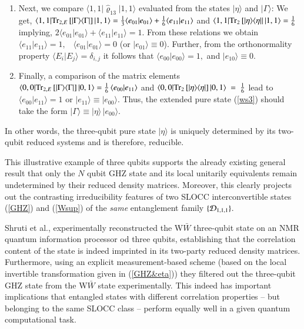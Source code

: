 {\begin{enumerate}
\item Next, we compare  $\langle 1,1\vert \hat{\varrho}_{13}\vert 1,1\rangle$ evaluated from the states 
$\vert\eta\rangle$ and $\vert\Gamma\rangle$:  
We get, 
$\langle 1,1|{\rm Tr}_{2, E}\, [|\Gamma\rangle \langle\Gamma|]\,\vert 1,1\rangle=
\frac{1}{3}\langle e_{01}|e_{01}\rangle+\frac{1}{6}\langle e_{11}|e_{11}\rangle$ 
and $\langle 1,1|{\rm Tr}_{2}\, [|\eta\rangle \langle\eta|\vert\, |1,1\rangle=\frac{1}{6}$ 
implying,  
$2\langle e_{01}|e_{01}\rangle+\langle e_{11}|e_{11}\rangle=1.$ 
From these relations we obtain $\langle e_{11}|e_{11}\rangle=1,$ \ 
$\langle e_{01}|e_{01}\rangle=0$ (or $\vert e_{01}\rangle\equiv 0$).
Further, from the orthonormality property $\langle E_i\vert E_j\rangle=\delta_{i,j}$
it follows that $\langle e_{00}\vert e_{00}\rangle=1,$ and  
$\vert e_{10}\rangle\equiv 0.$ 

\item Finally, a comparison of the matrix elements    
$\langle 0,0|{\rm Tr}_{2,E}\,[\vert\Gamma\rangle \langle\Gamma\vert]\, |0,1\rangle= 
\frac{1}{6}\, \langle e_{00}|e_{11}\rangle$ and 
 $\langle 0,0|{\rm Tr}_{2}\,[\vert\eta\rangle \langle\eta\vert]\, |0,1\rangle~=~ 
\frac{1}{6}$ 
lead to $\langle e_{00}|e_{11}\rangle=1$ or $\vert e_{11}\rangle\equiv \vert e_{00}\rangle.$ 
Thus,  the extended pure state (\ref{ws3}) should take the form 
$\vert \Gamma\rangle\equiv \vert \eta\rangle \, \vert e_{00}\rangle.$ 
\end{enumerate}
In other words,  the three-qubit pure state $\vert \eta\rangle$  is uniquely determined by its two-qubit reduced %
systems and is therefore, reducible. 

This illustrative example of three qubits supports the already existing general result \cite{Walck,Walck2} that only the $N$ qubit GHZ state and its local unitarily equivalents remain undetermined by their reduced density matrices. Moreover, this clearly projects out the contrasting  irreducibility features of two SLOCC interconvertible states (\ref{GHZ}) and (\ref{Wsup}) of the {\em same}  
entanglement family $\{{\cal D}_{1,1,1}\}$.   

Shruti et al., \cite{arvind} experimentally reconstructed the W$\bar W$ three-qubit state on an NMR quantum
information processor od three qubits,  establishing that the correlation content of the state is indeed imprinted in 
 its two-party reduced density matrices. Furthermore, using an explicit measurement-based scheme (based on the local invertible transformation given in (\ref{GHZ&eta}))  they filtered out the  three-qubit GHZ state from the W$\bar W$ state experimentally. This indeed has important implications that  entangled states with different correlation properties -- but  belonging to the same SLOCC class -- perform equally well in a given quantum computational task.  
 


}
